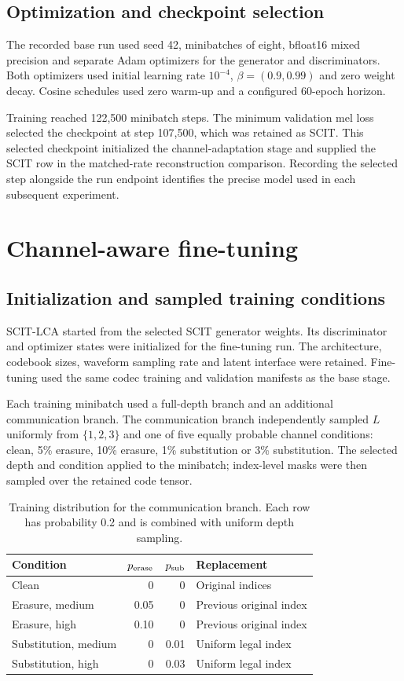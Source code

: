 \subsection{Optimization and checkpoint selection}
The recorded base run used seed 42, minibatches of eight, bfloat16 mixed precision and separate Adam optimizers for the generator and discriminators. Both optimizers used initial learning rate $10^{-4}$, $\beta=(0.9,0.99)$ and zero weight decay. Cosine schedules used zero warm-up and a configured 60-epoch horizon.

Training reached 122,500 minibatch steps. The minimum validation mel loss selected the checkpoint at step 107,500, which was retained as SCIT. This selected checkpoint initialized the channel-adaptation stage and supplied the SCIT row in the matched-rate reconstruction comparison. Recording the selected step alongside the run endpoint identifies the precise model used in each subsequent experiment.

\section{Channel-aware fine-tuning}
\label{sec:sv2-lca}

\subsection{Initialization and sampled training conditions}
SCIT-LCA started from the selected SCIT generator weights. Its discriminator and optimizer states were initialized for the fine-tuning run. The architecture, codebook sizes, waveform sampling rate and latent interface were retained. Fine-tuning used the same codec training and validation manifests as the base stage.

Each training minibatch used a full-depth branch and an additional communication branch. The communication branch independently sampled $L$ uniformly from $\{1,2,3\}$ and one of five equally probable channel conditions: clean, 5\% erasure, 10\% erasure, 1\% substitution or 3\% substitution. The selected depth and condition applied to the minibatch; index-level masks were then sampled over the retained code tensor.

\begin{table}[t]
\centering
\caption{Training distribution for the communication branch. Each row has probability 0.2 and is combined with uniform depth sampling.}
\label{tab:sv2-lca-conditions}
\small
\begin{tabularx}{\columnwidth}{@{}lrrY@{}}
\toprule
Condition & $p_{\rm erase}$ & $p_{\rm sub}$ & Replacement\\
\midrule
Clean & 0 & 0 & Original indices\\
Erasure, medium & 0.05 & 0 & Previous original index\\
Erasure, high & 0.10 & 0 & Previous original index\\
Substitution, medium & 0 & 0.01 & Uniform legal index\\
Substitution, high & 0 & 0.03 & Uniform legal index\\
\bottomrule
\end{tabularx}
\end{table}

